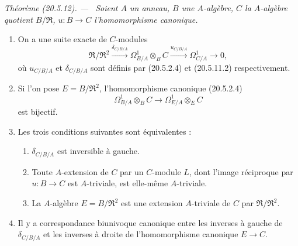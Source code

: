 \documentclass[10pt,oneside]{book}
\makeatletter
\newcommand{\setmanualcurrentlabel}[1]{\def\@currentlabel{#1}}
\newenvironment{theorem}[1][]{%
  \setmanualcurrentlabel{#1}\par\medskip\noindent\itshape Théorème (#1). ---\ }{\par}
\makeatother
\begin{document}
\begin{theorem}[20.5.12]
\label{0.20.5.12-fr}
Soient $A$ un anneau, $B$ une $A$-algèbre, $C$ la $A$-algèbre quotient
$B/\mathfrak{R}$, $u:B\to C$ l'homomorphisme canonique.
\begin{enumerate}
  \item[\rm(i)] On a une suite exacte de $C$-modules
\begin{equation}
\tag{20.5.12.1}
\label{0.20.5.12.1-fr}
  \mathfrak{R}/\mathfrak{R}^2
  \xrightarrow{\delta_{C/B/A}}\Omega^1_{B/A}\otimes_B C
  \xrightarrow{u_{C/B/A}}\Omega^1_{C/A}\longrightarrow 0,
\end{equation}
où $u_{C/B/A}$ et $\delta_{C/B/A}$ sont définis par (20.5.2.4) et
(20.5.11.2) respectivement.
  \item[\rm(ii)] Si l'on pose $E=B/\mathfrak{R}^2$, l'homomorphisme
canonique (20.5.2.4)
\[
  \Omega^1_{B/A}\otimes_B C\longrightarrow
  \Omega^1_{E/A}\otimes_E C
\]
est bijectif.
  \item[\rm(iii)] Les trois conditions suivantes sont équivalentes :
  \begin{enumerate}
    \item[\rm a)] $\delta_{C/B/A}$ est inversible à gauche.
    \item[\rm b)] Toute $A$-extension de $C$ par un $C$-module $L$, dont
l'image réciproque par $u:B\to C$ est $A$-triviale, est elle-même
$A$-triviale.
    \item[\rm c)] La $A$-algèbre $E=B/\mathfrak{R}^2$ est une extension
$A$-triviale de $C$ par $\mathfrak{R}/\mathfrak{R}^2$.
  \end{enumerate}
  \item[\rm(iv)] Il y a correspondance biunivoque canonique entre les
inverses à gauche de $\delta_{C/B/A}$ et les inverses à droite de
l'homomorphisme canonique $E\to C$.
\end{enumerate}
\end{theorem}
\end{document}
